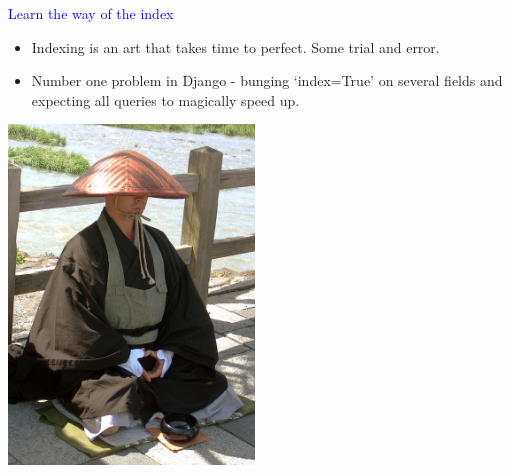 \documentclass[landscape]{slides}
\begin{document}
\begin{slide}

    \textcolor{blue}{\Large{Learn the way of the index}}

    \begin{itemize}
        \item Indexing is an art that takes time to perfect. Some trial and error.
        \item Number one problem in Django - bunging `index=True' on several fields and expecting all queries to magically speed up.
    \end{itemize}

    \begin{center}
        \includegraphics[height=9cm]{buddhist-monk}
    \end{center}

\end{slide}
\end{document}

